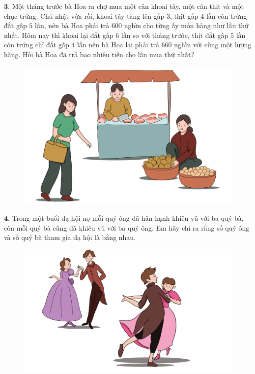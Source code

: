 \begin{multicols}{2}
\begin{figure}[H]
		\vspace*{-10pt}
	\end{figure}
	$\pmb{3.}$ Một tháng trước bà Hoa ra chợ mua một cân khoai tây, một cân thịt và một chục trứng. Chủ nhật vừa rồi, khoai tây tăng lên gấp $3$, thịt gấp $4$ lần còn trứng đắt gấp $5$ lần, nên bà Hoa phải trả $600$ nghìn cho từng ấy món hàng như lần thứ nhất. Hôm nay thì khoai lại đắt gấp $6$ lần so với tháng trước, thịt đắt gấp $5$ lần còn trứng chỉ đắt gấp $4$ lần nên bà Hoa lại phải trả $660$ nghìn với cùng một lượng hàng. Hỏi bà Hoa đã trả bao nhiêu tiền cho lần mua thứ nhất?
	\begin{figure}[H]
		\centering
		\vspace*{-10pt}
		\captionsetup{labelformat= empty, justification=centering}
		\includegraphics[width=0.9\linewidth]{Pi1_2_Bai3}
		\vspace*{-10pt}
	\end{figure}
	$\pmb{4.}$ Trong một buổi dạ hội nọ mỗi quý ông đã hân hạnh khiêu vũ với ba quý bà, còn mỗi quý bà cũng đã khiêu vũ với ba quý ông. Em hãy chỉ ra rằng số quý ông và số quý bà tham gia dạ hội là bằng nhau.
	\begin{figure}[H]
		\centering
		\vspace*{-5pt}
		\captionsetup{labelformat= empty, justification=centering}
		\includegraphics[width=1\linewidth]{Pi1_2_Bai4}

\end{figure}
\end{multicols}
